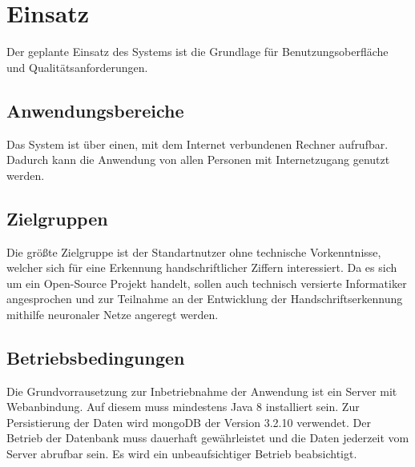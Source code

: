  \chapter{Einsatz}
Der geplante Einsatz des Systems ist die Grundlage für Benutzungsoberfläche und
Qualitätsanforderungen.
 
\section{Anwendungsbereiche}

Das System ist über einen, mit dem Internet verbundenen Rechner aufrufbar.
Dadurch kann die Anwendung von allen Personen mit Internetzugang genutzt werden.


 
\section{Zielgruppen}

Die größte Zielgruppe ist der Standartnutzer ohne technische Vorkenntnisse, welcher sich für eine Erkennung handschriftlicher Ziffern interessiert.
Da es sich um ein Open-Source Projekt handelt, sollen auch technisch versierte Informatiker angesprochen und zur Teilnahme an der Entwicklung 
der Handschriftserkennung mithilfe neuronaler Netze angeregt werden.

\section{Betriebsbedingungen}

Die Grundvorrausetzung zur Inbetriebnahme der Anwendung ist ein Server mit Webanbindung. Auf diesem muss mindestens Java 8 installiert sein.
Zur Persistierung der Daten wird mongoDB der Version 3.2.10 verwendet. Der Betrieb der Datenbank muss dauerhaft gewährleistet und die Daten
jederzeit vom Server abrufbar sein. Es wird ein unbeaufsichtiger Betrieb beabsichtigt. 
